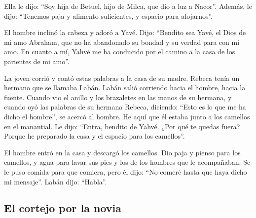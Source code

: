  Ella le dijo: ``Soy hija de Betuel, hijo de Milca, que
dio a luz a Nacor''.  Además, le dijo: ``Tenemos paja y
alimento suficientes, y espacio para alojarnos''.

 El hombre inclinó la cabeza y adoró a Yavé.
 Dijo: ``Bendito sea Yavé, el Dios de mi amo Abraham, que
no ha abandonado su bondad y su verdad para con mi amo. En cuanto a mí,
Yahvé me ha conducido por el camino a la casa de los parientes de mi
amo''.

 La joven corrió y contó estas palabras a la casa de su
madre.  Rebeca tenía un hermano que se llamaba Labán.
Labán salió corriendo hacia el hombre, hacia la fuente. 
Cuando vio el anillo y los brazaletes en las manos de su hermana, y
cuando oyó las palabras de su hermana Rebeca, diciendo: ``Esto es lo que
me ha dicho el hombre'', se acercó al hombre. He aquí que él estaba
junto a los camellos en el manantial.  Le dijo: ``Entra,
bendito de Yahvé. ¿Por qué te quedas fuera? Porque he preparado la casa
y el espacio para los camellos''.

 El hombre entró en la casa y descargó los camellos. Dio
paja y pienso para los camellos, y agua para lavar sus pies y los de los
hombres que le acompañaban.  Se le puso comida para que
comiera, pero él dijo: ``No comeré hasta que haya dicho mi mensaje''.
Labán dijo: ``Habla''.

\hypertarget{el-cortejo-por-la-novia}{%
\subsection{El cortejo por la novia}\label{el-cortejo-por-la-novia}}

